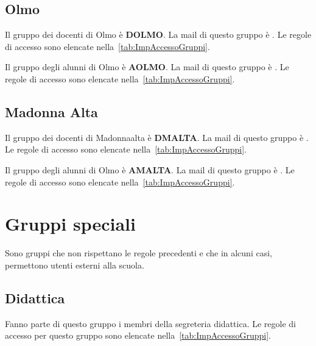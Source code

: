 \subsection{Olmo}
Il gruppo dei docenti di Olmo è \textbf{DOLMO}. La mail di questo gruppo è . Le  regole di accesso  sono elencate nella~\cref{tab:ImpAccessoGruppi}. 

Il gruppo degli alunni di Olmo è \textbf{AOLMO}. La mail di questo gruppo è . Le  regole di accesso  sono elencate nella~\cref{tab:ImpAccessoGruppi}. 
\subsection{Madonna Alta}
Il gruppo dei docenti di Madonnaalta è \textbf{DMALTA}. La mail di questo gruppo è . Le  regole di accesso  sono elencate nella~\cref{tab:ImpAccessoGruppi}. 

Il gruppo degli alunni di Olmo è \textbf{AMALTA}. La mail di questo gruppo è . Le  regole di accesso  sono elencate nella~\cref{tab:ImpAccessoGruppi}. 
\section{Gruppi speciali}
Sono gruppi che non rispettano le regole precedenti e che in alcuni casi, permettono utenti esterni alla scuola.
\subsection{Didattica}
Fanno parte di questo gruppo i membri della segreteria didattica. Le  regole di accesso per questo gruppo sono elencate nella~\cref{tab:ImpAccessoGruppi}.
